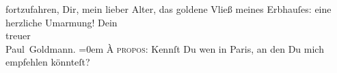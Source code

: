 \begin{ledgroupsized}[t]{13cm}
               fortzufahren, Dir, mein lieber Alter, das goldene Vließ meines Erbhauſes: eine
               herzliche Umarmung!\pend
           \pstart
           Dein {\\[\baselineskip]}treuer {\\[\baselineskip]}\spacefill\mbox{Paul Goldmann.}\pend
           \leftskip=0em{}\pstart
           \noindent{}\textsc{À propos}: Kennſt Du wen in Paris, an den Du mich empfehlen könnteſt?\pend
           
         
         \endnumbering{}\end{ledgroupsized}  \newcommand{\dateiname}{L02670}\newcommand{\titel}{Paul Goldmann an Arthur Schnitzler, 15. 11. 1891}\newcommand{\editorInnen}{Martin Anton Müller und Laura Untner}
      